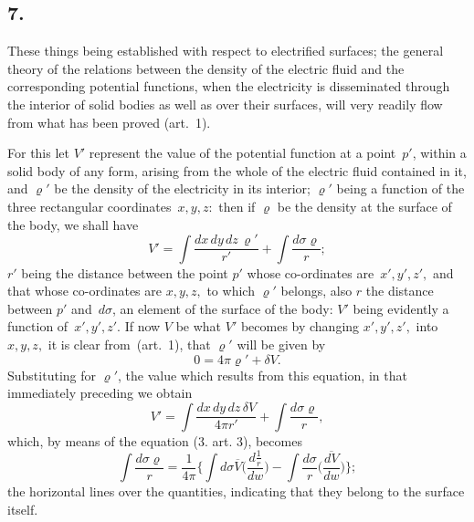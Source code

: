 \documentclass[12pt,notitlepage]{amsart}
\newcommand\Section[1]{\subsection{{#1}}}
\renewcommand{\rho}{\varrho}
\begin{document}
\Section{7.}
These things being established with respect to electrified surfaces; the
general theory of the relations between the density of the electric fluid and
the corresponding potential functions,
when the electricity is disseminated through
the interior of solid bodies as well as over their surfaces, will very readily
flow from what has been proved (art.~1).

For this let $V'$ represent the value of the potential function
at a point~$p'$,
within a solid body of any form, arising from the whole of the electric fluid
contained in it, and $\rho'$ be
the density of the electricity in its interior; $\rho'$ being
a function of the three rectangular coordinates~$x,y,z:$
then if $\rho$ be the density
at the surface of the body, we shall have
\[
V'=\int\frac{dx\,dy\,dz\,\rho'}{r'}+\int\frac{d\sigma\rho}{r};
\]
$r'$ being the distance between the point $p'$
whose co-ordinates are~$x',y',z',$
and that whose co-ordinates are $x,y,z,$
to which $\rho'$ belongs, also $r$ the
distance between $p'$ and~$d\sigma$,
an element of the surface of the body: $V'$ being
evidently a function of~$x',y',z'$. If now $V$ be
what $V'$ becomes by changing
$x',y',z',$ into~$x,y,z,$ it is clear from~(art.~1),
that $\rho'$ will be given by
\[
0=4\pi\rho'+\delta V.
\]
Substituting for $\rho'$,
the value which results from this equation, in that immediately
preceding we obtain
\[
V'=\int\frac{dx\,dy\,dz\,\delta V}{4\pi r'}+\int\frac{d\sigma\rho}{r},
\]
which, by means of the equation (3. art. 3), becomes
\[
\int\frac{d\sigma\rho}{r}=
\frac{1}{4\pi}\biggl\{
  \int d\sigma\overline{V}
  \biggl(\frac{d\frac1r}{dw}\biggr)
  -\int\frac{d\sigma}{r}
  \biggl(\frac{\overline{dV}}{dw}\biggr)
\biggr\};
\]
the horizontal lines over the quantities, indicating that they belong to the
surface itself.
\end{document}
